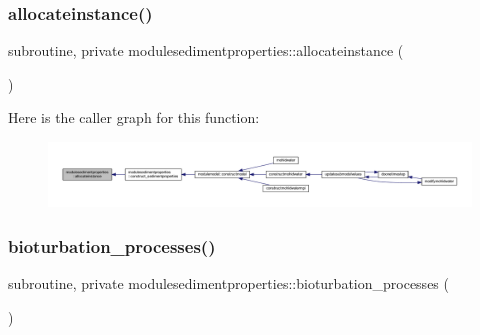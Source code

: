 \subsubsection{\texorpdfstring{allocateinstance()}{allocateinstance()}}
{\footnotesize\ttfamily subroutine, private modulesedimentproperties\+::allocateinstance (\begin{DoxyParamCaption}{ }\end{DoxyParamCaption})\hspace{0.3cm}{\ttfamily [private]}}

Here is the caller graph for this function\+:\nopagebreak
\begin{figure}[H]
\begin{center}
\leavevmode
\includegraphics[width=350pt]{namespacemodulesedimentproperties_a0e2131732a53a8682cb31baa3a65d6ae_icgraph}
\end{center}
\end{figure}
\mbox{\label{namespacemodulesedimentproperties_a1d7c298cf760f1e569bc908fe283cb62}} 
\subsubsection{\texorpdfstring{bioturbation\+\_\+processes()}{bioturbation\_processes()}}
{\footnotesize\ttfamily subroutine, private modulesedimentproperties\+::bioturbation\+\_\+processes (\begin{DoxyParamCaption}{ }\end{DoxyParamCaption})\hspace{0.3cm}{\ttfamily [private]}}

